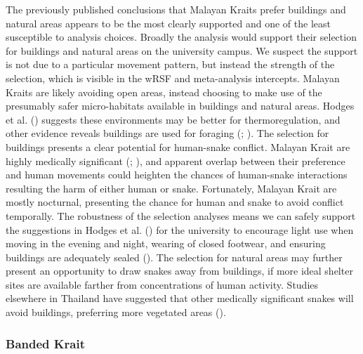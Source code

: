 \documentclass[10pt,a4paper]{article}
\begin{document}
The previously published conclusions that Malayan Kraits prefer buildings and natural areas appears to be the most clearly supported and one of the least susceptible to analysis choices.
Broadly the analysis would support their selection for buildings and natural areas on the university campus.
We suspect the support is not due to a particular movement pattern, but instead the strength of the selection, which is visible in the wRSF and meta-analysis intercepts.
Malayan Kraits are likely avoiding open areas, instead choosing to make use of the presumably safer micro-habitats available in buildings and natural areas.
Hodges et al. () suggests these environments may be better for thermoregulation, and other evidence reveals buildings are used for foraging (; ).
The selection for buildings presents a clear potential for human-snake conflict.
Malayan Krait are highly medically significant (; ), and apparent overlap between their preference and human movements could heighten the chances of human-snake interactions resulting the harm of either human or snake.
Fortunately, Malayan Krait are mostly nocturnal, presenting the chance for human and snake to avoid conflict temporally.
The robustness of the selection analyses means we can safely support the suggestions in Hodges et al. () for the university to encourage light use when moving in the evening and night, wearing of closed footwear, and ensuring buildings are adequately sealed ().
The selection for natural areas may further present an opportunity to draw snakes away from buildings, if more ideal shelter sites are available farther from concentrations of human activity.
Studies elsewhere in Thailand have suggested that other medically significant snakes will avoid buildings, preferring more vegetated areas ().

\subsubsection{Banded Krait}\label{banded-krait-1}
\end{document}
